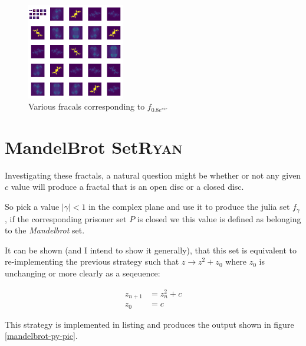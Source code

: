 \documentclass[a4paper,11pt,twoside]{article}
\begin{document}
\begin{figure}[htbp]
\centering
\includegraphics[width=0.38\textwidth]{media/Outline/many_julia_fractals_around_circle.png}
\caption{\label{montage-frac}Various fracals corresponding to \(f_{0.8 e^{\pi i \tau}}\)}
\end{figure}

\section{MandelBrot Set\hfill{}\textsc{Ryan}}
\label{mandlebrot-set}
Investigating these fractals, a natural question might be whether or not any
given \(c\) value will produce a fractal that is an open disc or a closed disc.

So pick a value \(\left\lvert \gamma \right \rvert < 1\) in the complex plane and
use it to produce the julia set \(f_{\gamma}\), if the corresponding prisoner set
\(P\) is closed we this value is defined as belonging to the \emph{Mandelbrot} set.

It can be shown (and I intend to show it generally), that this set is equivalent to re-implementing the previous strategy such that \(z \rightarrow z^{2} + z_{0}\) where \(z_{0}\) is unchanging or more clearly as a seqeuence:

\begin{align}
z_{n+1} &= z^{2}_n + c \label{eq:mb-sequence} \\
z_{0}   &= c
\end{align}

This strategy is implemented in listing and produces the output shown in figure \ref{mandelbrot-py-pic}.
\end{document}
